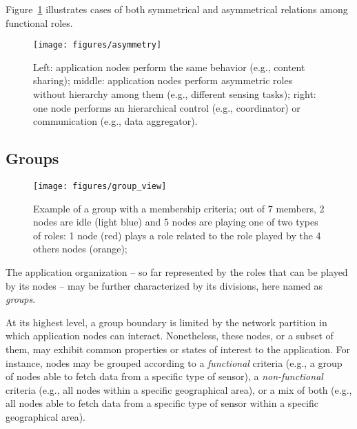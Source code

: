 Figure~\ref{fig:asymmetry} illustrates cases of both symmetrical and asymmetrical relations among functional roles. 

\begin{figure}[t!]
	\centering
	\texttt{[image: figures/asymmetry]}
	\caption{Left: application nodes perform the same behavior (e.g., content sharing); middle: application nodes perform asymmetric roles without hierarchy among them (e.g., different sensing tasks); right: one node performs an hierarchical control (e.g., coordinator) or communication (e.g., data aggregator).}
	\label{fig:asymmetry}
\end{figure}


\subsection{Groups}\label{sec:groups}

\begin{figure}[t!]
	\centering
	\texttt{[image: figures/group\_view]}
	\caption{Example of a group with a  membership criteria; out of 7 members, 2 nodes are idle (light blue) and 5 nodes are playing one of two types of roles: 1 node (red) plays a role related to the role played by the 4 others nodes (orange);}
	\label{fig:group_view}
\end{figure}

The application organization -- so far represented by the roles that can be played by its nodes -- may be further characterized by its divisions, here named as \textit{groups}. 

At its highest level, a group boundary is limited by the network partition in which application nodes can interact. Nonetheless, these nodes, or a subset of them, may exhibit common properties or states of interest to the application. For instance, nodes may be grouped according to a \textit{functional} criteria (e.g., a group of nodes able to fetch data from a specific type of sensor), a \textit{non-functional} criteria (e.g., all nodes within a specific geographical area), or a mix of both (e.g., all nodes able to fetch data from a specific type of sensor within a specific geographical area). 


